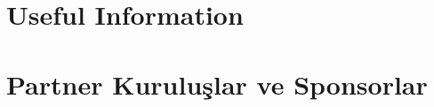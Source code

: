 \documentclass[openany, parskip=full, 12pt, a4]{scrbook}
\begin{document}
\chapter{Useful Information}



\chapter{Partner Kuruluşlar ve Sponsorlar}



\newpage


\pagecolor{basarimgold}
\thispagestyle{empty}
\mbox{}

\newpage
\nopagecolor
\thispagestyle{empty}
\end{document}
